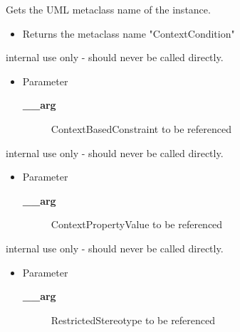 \begin{desc}Gets the UML metaclass name of the instance.
\begin{itemize}
\item{Returns the metaclass name "ContextCondition" }
\end{itemize}
\end{desc}

\begin{desc}internal use only - should never be called directly.
\begin{itemize}
\item{Parameter
  \begin{description}
   \item[{\bf \_\_arg}]{ContextBasedConstraint to be referenced}
  \end{description}}
\end{itemize}
\end{desc}

\begin{desc}internal use only - should never be called directly.
\begin{itemize}
\item{Parameter
  \begin{description}
   \item[{\bf \_\_arg}]{ContextPropertyValue to be referenced}
  \end{description}}
\end{itemize}
\end{desc}

\begin{desc}internal use only - should never be called directly.
\begin{itemize}
\item{Parameter
  \begin{description}
   \item[{\bf \_\_arg}]{RestrictedStereotype to be referenced}
  \end{description}}
\end{itemize}
\end{desc}

